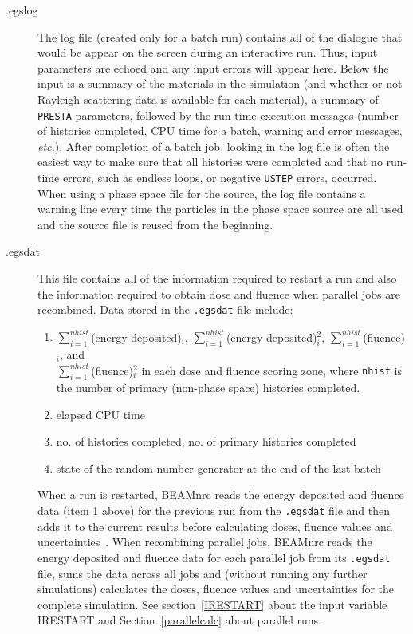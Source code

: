 \documentclass[12pt,twoside]{article}
\newcommand{\etc}{{\em etc.}}
\begin{document}
\begin{description}
\begin{description}
\end{description}

\item [.egslog]
The log file (created only for a batch run) contains all of the
dialogue that would be appear on the screen during an
interactive run.  Thus, input parameters are echoed and any input errors
will appear here.  Below the input is a summary of the materials in the
simulation (and
whether or not Rayleigh scattering data is available for each material),
a summary of \verb+PRESTA+ parameters, followed by the run-time execution
messages (number of histories completed, CPU time for a batch, warning
and error messages, \etc).
After completion of a batch job, looking in the log file
is often the easiest way to make sure that all histories were completed
and that no run-time errors, such as endless loops, or negative
\verb+USTEP+
errors, occurred.  When using a phase space file for the source,
the log file contains a warning
line every time the particles in the phase space source are
all used and the source file is reused from  the beginning.

\item [.egsdat]
This file contains all of the information required to restart a run and
also the information required to obtain dose and fluence when parallel
jobs are recombined.  Data stored in the {\tt .egsdat}
file include:
\begin{enumerate}
\item $\sum_{i=1}^{nhist}$(energy deposited)$_i$,
      $\sum_{i=1}^{nhist}$(energy deposited)$^2_i$,
      $\sum_{i=1}^{nhist}$(fluence)$_i$, and\\
      $\sum_{i=1}^{nhist}$(fluence)$^2_i$ in each dose and fluence scoring
      zone, where {\tt nhist} is the number of primary (non-phase space)
      histories completed.
\item elapsed CPU time
\item no. of histories completed, no. of primary histories completed
\item state of the random number generator at the end of the last batch
\end{enumerate}
When a run is restarted, BEAMnrc reads the energy deposited and
fluence data (item 1 above) for the previous run from the {\tt .egsdat}
file and then adds it to the current results before calculating
doses, fluence values and uncertainties~\cite{Wa02a}.  When
recombining parallel jobs, BEAMnrc reads the energy deposited and
fluence data for each parallel job from its {\tt .egsdat} file,
sums the data across all jobs and
(without running any further simulations)
calculates the doses, fluence values and uncertainties
for the complete simulation.
See section~\ref{IRESTART} about the input variable IRESTART and
Section~\ref{parallelcalc} about parallel runs.


\end{description}
\end{document}
